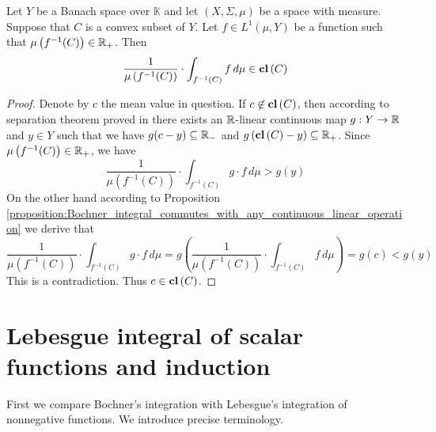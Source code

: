 \begin{proposition}\label{proposition:if_function_admit_values_in_convex_set_then_the_mean_value_is_also_in_that_set}
    Let $Y$ be a Banach space over $\mathbb{K}$ and let $(X,\Sigma,\mu)$ be a space with measure. Suppose that $C$ is a convex subset of $Y$. Let $f \in L^1(\mu,Y)$ be a function such that $\mu\left(f^{-1}(C)\right) \in {\mathbb R}_+$. Then
    $$\frac{1}{\mu\left(f^{-1}(C)\right)}\cdot \int_{f^{-1}(C)}f\,d\mu \in \mathbf{cl}\left(C\right)$$
\end{proposition}
\begin{proof}
    Denote by $c$ the mean value in question. If $c \not \in \mathbf{cl}\left(C\right)$, then according to separation theorem proved in \cite{Hahn_Banach} there exists an ${\mathbb R}$-linear continuous map $g:Y\rightarrow {\mathbb R}$ and $y \in Y$ such that we have $g(c - y) \subseteq {\mathbb R}_-$ and $g\left(\mathbf{cl}\left(C\right) - y\right)\subseteq {\mathbb R}_+$. Since $\mu\left(f^{-1}(C)\right) \in {\mathbb R}_+$, we have
    $$\frac{1}{\mu\left(f^{-1}(C)\right)}\cdot \int_{f^{-1}(C)} g\cdot f\,d\mu > g(y)$$
    On the other hand according to Proposition \ref{proposition:Bochner_integral_commutes_with_any_continuous_linear_operation} we derive that
    $$\frac{1}{\mu\left(f^{-1}(C)\right)}\cdot \int_{f^{-1}(C)} g\cdot f\,d\mu = g\left(\frac{1}{\mu\left(f^{-1}(C)\right)}\cdot \int_{f^{-1}(C)}f\,d\mu\right) = g(c) < g(y)$$
    This is a contradiction. Thus $c \in \mathbf{cl}\left(C\right)$.
\end{proof}

\section{Lebesgue integral of scalar functions and induction}
\noindent
First we compare Bochner's integration with Lebesgue's integration of nonnegative functions. We introduce precise terminology.


